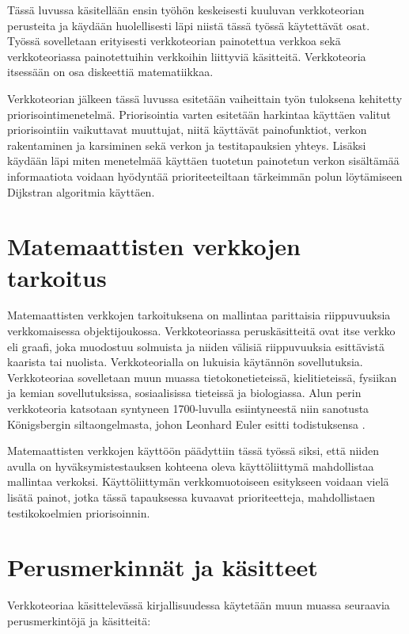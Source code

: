 Tässä luvussa käsitellään ensin työhön keskeisesti kuuluvan verkkoteorian perusteita ja käydään huolellisesti läpi niistä tässä työssä käytettävät osat.
Työssä sovelletaan erityisesti verkkoteorian painotettua verkkoa sekä verkkoteoriassa painotettuihin verkkoihin liittyviä käsitteitä.
Verkkoteoria itsessään on osa diskeettiä matematiikkaa.

Verkkoteorian jälkeen tässä luvussa esitetään vaiheittain työn tuloksena kehitetty priorisointimenetelmä.
Priorisointia varten esitetään harkintaa käyttäen valitut priorisointiin vaikuttavat muuttujat, niitä käyttävät painofunktiot, verkon rakentaminen ja karsiminen sekä verkon ja testitapauksien yhteys.
Lisäksi käydään läpi miten menetelmää käyttäen tuotetun painotetun verkon sisältämää informaatiota voidaan hyödyntää prioriteeteiltaan tärkeimmän polun löytämiseen Dijkstran algoritmia käyttäen.

\section{Matemaattisten verkkojen tarkoitus} \label{ch:09_matemaattisten_verkkojen_tarkoitus}

  Matemaattisten verkkojen tarkoituksena on mallintaa parittaisia riippuvuuksia verkkomaisessa objektijoukossa.
  Verkkoteoriassa peruskäsitteitä ovat itse verkko eli graafi, joka muodostuu solmuista ja niiden välisiä riippuvuuksia esittävistä kaarista tai nuolista.
  Verkkoteorialla on lukuisia käytännön sovellutuksia. Verkkoteoriaa sovelletaan muun muassa tietokonetieteissä, kielitieteissä, fysiikan ja kemian sovellutuksissa, sosiaalisissa tieteissä ja biologiassa.
  Alun perin verkkoteoria katsotaan syntyneen 1700-luvulla esiintyneestä niin sanotusta Königsbergin siltaongelmasta, johon Leonhard Euler esitti todistuksensa \parencite{graph_theory_history}.

  Matemaattisten verkkojen käyttöön päädyttiin tässä työssä siksi, että niiden avulla on hyväksymistestauksen kohteena oleva käyttöliittymä mahdollistaa mallintaa verkoksi.
  Käyttöliittymän verkkomuotoiseen esitykseen voidaan vielä lisätä painot, jotka tässä tapauksessa kuvaavat prioriteetteja, mahdollistaen testikokoelmien priorisoinnin.

\section{Perusmerkinnät ja käsitteet} \label{ch:09_perusmerkinnat_ja_kasitteet}

  Verkkoteoriaa käsittelevässä kirjallisuudessa \parencite{graph_theory_concepts_1}\parencite{graph_theory_concepts_2}\parencite{graph_theory_concepts_3} käytetään muun muassa seuraavia perusmerkintöjä ja käsitteitä:

